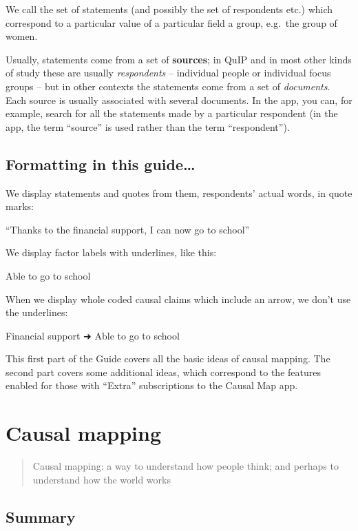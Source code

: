 \documentclass[
]{book}
\begin{document}
We call the set of statements (and possibly the set of respondents etc.) which correspond to a particular value of a particular field a group, e.g.~the group of women.

Usually, statements come from a set of \textbf{sources}; in QuIP and in most other kinds of study these are usually \emph{respondents} -- individual people or individual focus groups -- but in other contexts the statements come from a set of \emph{documents}. Each source is usually associated with several documents. In the app, you can, for example, search for all the statements made by a particular respondent (in the app, the term ``source'' is used rather than the term ``respondent'').

\hypertarget{formatting-in-this-guide}{%
\section{Formatting in this guide\ldots{}}\label{formatting-in-this-guide}}

We display statements and quotes from them, respondents' actual words, in quote marks:

``Thanks to the financial support, I can now go to school''

We display factor labels with underlines, like this:

Able to go to school

When we display whole coded causal claims which include an arrow, we don't use the underlines:

Financial support ➜ Able to go to school

This first part of the Guide covers all the basic ideas of causal mapping. The second part covers some additional ideas, which correspond to the features enabled for those with ``Extra'' subscriptions to the Causal Map app.

\hypertarget{mapping}{%
\chapter{Causal mapping}\label{mapping}}

\begin{quote}
Causal mapping: a way to understand how people think; and perhaps to understand how the world works
\end{quote}

\hypertarget{summary}{%
\section{Summary}\label{summary}}
\end{document}
